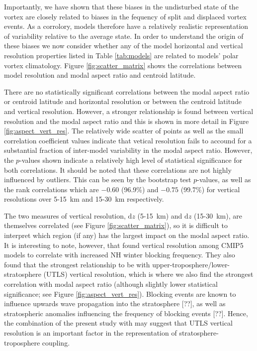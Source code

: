 Importantly, we have shown that these biases in the undisturbed state of the
vortex are closely related to biases in the fequency of split and displaced
vortex events. As a corrolory, models therefore have a relatively realistic
representation of variability relative to the average state. In order to
understand the origin of these biases we now consider whether any of the model
horizontal and vertical resolution properties listed in Table \ref{tab:models}
are related to models' polar vortex climatology. Figure \ref{fig:scatter_matrix}
shows the correlations between model resolution and modal aspect ratio and
centroid latitude. 

There are no statistically significant correlations between the modal aspect
ratio or centroid latitude and horizontal resolution or between the centroid
latitude and vertical resolution. However, a stronger relationship is found
between vertical resolution and the modal aspect ratio and this is shown in more
detail in Figure \ref{fig:aspect_vert_res}. The relatively wide scatter of
points as well as the small correlation coefficient values indicate that vetical
resolution fails to accound for a substantial fraction of inter-model
variability in the modal aspect ratio. However, the $p$-values shown indicate a
relatively high level of statistical significance for both correlations. It
should be noted that these correlations are not highly influenced by
outliers. This can be seen by the bootstrap test $p$-values, as well as the rank
correlations which are $-0.60$ (96.9\%) and $-0.75$ (99.7\%) for vertical
resolutions over 5-15~km and 15-30~km respectively.

The two measures of vertical resolution, $\mathrm{d}z$ (5-15~km) and
$\mathrm{d}z$ (15-30~km), are themselves correlated (see Figure
\ref{fig:scatter_matrix}), so it is difficult to interpret which region (if any)
has the largest impact on the modal aspect ratio. It is interesting to note,
however, that \citet{Anstey2013} found vertical resolution among CMIP5 models to
correlate with increased NH winter blocking frequency. They also found that the
strongest relationship to be with upper-troposphere/lower-stratosphere (UTLS)
vertical resolution, which is where we also find the strongest correlation with
modal aspect ratio (although slightly lower statistical significance; see Figure
\ref{fig:aspect_vert_res}). Blocking events are known to influence upwards wave
propagation into the stratosphere [??], as well as stratospheric anomalies
influencing the frequency of blocking events [??]. Hence, the combination of the
present study with \citet{Anstey2013} may suggest that UTLS vertical resolution
is an important factor in the representation of stratosphere-troposphere
coupling.

